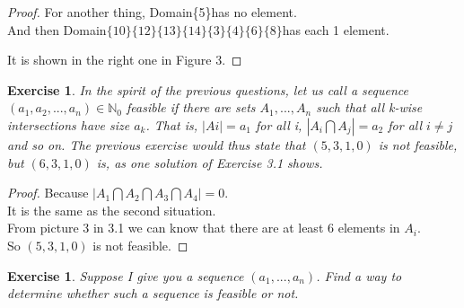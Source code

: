 \documentclass[12pt,a4]{article}
\theoremstyle{exercise}
\newtheorem{exercise}[theorem]{Exercise}
\begin{document}
\begin{proof}

    For another thing, Domain\{5\}has no element.
    \\And then Domain$\{10\}\{12\}\{13\}\{14\}\{3\}\{4\}\{6\}\{8\}$has each 1 element.

    It is shown in the right one in Figure 3.
\end{proof}

\begin{exercise}
	In the spirit of the previous questions, let us call a sequence $(a_1,a_2,...,a_n)\in\mathbb{N}_0$ feasible if there are sets $A_1,...,A_n$ such that all k-wise intersections have size $a_k$. That is, $|Ai| = a_{1}$ for all i, $|A_i \bigcap A_j| = a_2$ for all $i \not= j$ and so on. The previous exercise would thus state that $(5, 3, 1, 0)$ is not feasible, but $(6, 3, 1, 0)$ is, as one solution of Exercise 3.1 shows.
\end{exercise}

\begin{proof}
	Because $|A_1 \bigcap A_2 \bigcap A_3 \bigcap A_4 |=0$.
\\ It is the same as the second situation.
\\From picture 3 in 3.1 we can know that there are at least 6 elements in $A_i$.
\\So $(5,3,1,0)$ is not feasible.
\end{proof}


\begin{exercise}

	Suppose I give you a sequence $(a_1,...,a_n)$. Find a way to determine whether such a sequence is feasible or not.
\end{exercise}
\end{document}
